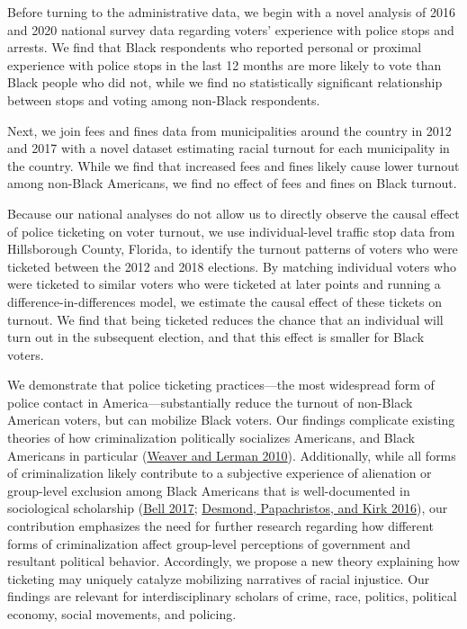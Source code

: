 \documentclass[
  12pt,
]{article}
\begin{document}
Before turning to the administrative data, we begin with a novel analysis of 2016 and 2020 national survey data regarding voters' experience with police stops and arrests. We find that Black respondents who reported personal or proximal experience with police stops in the last 12 months are more likely to vote than Black people who did not, while we find no statistically significant relationship between stops and voting among non-Black respondents.

Next, we join fees and fines data from municipalities around the country in 2012 and 2017 with a novel dataset estimating racial turnout for each municipality in the country. While we find that increased fees and fines likely cause lower turnout among non-Black Americans, we find no effect of fees and fines on Black turnout.

Because our national analyses do not allow us to directly observe the causal effect of police ticketing on voter turnout, we use individual-level traffic stop data from Hillsborough County, Florida, to identify the turnout patterns of voters who were ticketed between the 2012 and 2018 elections. By matching individual voters who were ticketed to similar voters who were ticketed at later points and running a difference-in-differences model, we estimate the causal effect of these tickets on turnout. We find that being ticketed reduces the chance that an individual will turn out in the subsequent election, and that this effect is smaller for Black voters.

We demonstrate that police ticketing practices---the most widespread form of police contact in America---substantially reduce the turnout of non-Black American voters, but can mobilize Black voters. Our findings complicate existing theories of how criminalization politically socializes Americans, and Black Americans in particular (\protect\hyperlink{ref-Weaver2010}{Weaver and Lerman 2010}). Additionally, while all forms of criminalization likely contribute to a subjective experience of alienation or group-level exclusion among Black Americans that is well-documented in sociological scholarship (\protect\hyperlink{ref-Bell2017}{Bell 2017}; \protect\hyperlink{ref-Desmond2016}{Desmond, Papachristos, and Kirk 2016}), our contribution emphasizes the need for further research regarding how different forms of criminalization affect group-level perceptions of government and resultant political behavior. Accordingly, we propose a new theory explaining how ticketing may uniquely catalyze mobilizing narratives of racial injustice. Our findings are relevant for interdisciplinary scholars of crime, race, politics, political economy, social movements, and policing.
\end{document}
